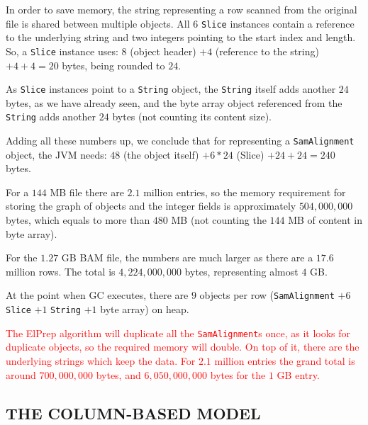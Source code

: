 \documentclass[a4paper,twoside]{article}
\begin{document}
In order to save memory, the string representing a row scanned from the original file is shared between multiple objects. All $6$ {\tt Slice} instances contain a reference to the  underlying string and two integers pointing to the start index and length. So, a {\tt Slice} instance uses: $8$ (object header) $+4$ (reference to the string) $ + 4 + 4 = 20$ bytes, being rounded to $24$.


As {\tt Slice} instances point to a {\tt String} object, the {\tt String} itself adds another $24$ bytes, as we have already seen, and the byte array object referenced from the {\tt String} adds another $24$ bytes (not counting its content size).


Adding all these numbers up, we conclude that for representing a {\tt SamAlignment} object, the JVM needs: $48$ (the object itself) $+ 6*24$ (Slice) $ + 24 + 24 = 240$ bytes.

For a $144$ MB file there are $2.1$ million entries, so the memory requirement for storing the graph of objects and the integer fields is approximately $504,000,000$ bytes, which equals to more than $480$ MB (not counting the $144$ MB of content in byte array).

For the $1.27$ GB BAM file, the numbers are much larger as there are a $17.6$ million rows. The total is $4,224,000,000$ bytes, representing almost $4$ GB.


At the point when GC executes, there are $9$ objects per row 
({\tt SamAlignment} $+ 6$ {\tt Slice} $+ 1$ {\tt String} $+ 1$ byte array) on heap.

\textcolor{red}{
The ElPrep algorithm will duplicate all the {\tt SamAlignment}s once, as it looks for duplicate objects, so the required memory will double. On top of it, there are the underlying strings which keep the data. For $2.1$ million entries the grand total is around $700,000,000$ bytes, and $6,050,000,000$ bytes for the $1$ GB entry.
}



\subsection{\uppercase{The Column-Based Model}} \label{model:column}
\end{document}
